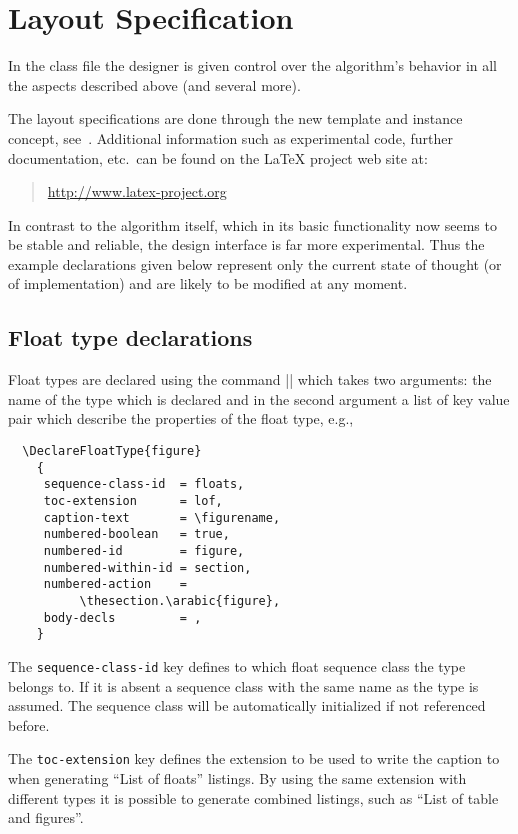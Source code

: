 \documentclass[twocolumn]{article}
\begin{document}
\section{Layout Specification}

In the class file the designer is given control over the algorithm's
behavior in all the aspects described above (and several more). 

The layout specifications are done through the new template and
instance concept, see~\cite{tub:MCR99-3}. 
Additional information such as experimental code, further
documentation, etc.\ can
be found on the \LaTeX{} project web site at:
\begin{quote}
\url{http://www.latex-project.org}
\end{quote}

In contrast to the algorithm itself, which in its basic functionality
now seems to be stable and reliable, the design interface is far
more experimental. Thus the example declarations given below represent
only the current state of thought (or of implementation) 
and are likely to be modified at any moment.


\subsection{Float type declarations}

Float types are declared using the  command |\DeclareFloatType| which
takes two arguments: the name of the type which is declared and in the
second argument a list of key value pair which describe the
properties of the float type, e.g.,
\begin{verbatim}
  \DeclareFloatType{figure}
    {
     sequence-class-id  = floats,
     toc-extension      = lof,
     caption-text       = \figurename,
     numbered-boolean   = true,
     numbered-id        = figure,
     numbered-within-id = section,
     numbered-action    = 
          \thesection.\arabic{figure},
     body-decls         = ,
    }
\end{verbatim}
The \texttt{sequence-class-id} key defines to which float sequence
class the type belongs to. If it is absent a sequence class with the
same name as the type is assumed. The sequence class will be
automatically initialized if not referenced before.

The \texttt{toc-extension} key defines the extension to be used to
write the caption to when generating ``List of floats'' listings. By
using the same extension with different types it is possible to
generate combined listings, such as ``List of table and figures''.
\end{document}
